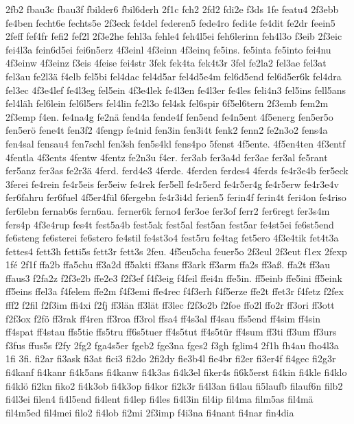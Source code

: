 {2fb2
fbau3c
fbau3f
fbilder6
fbil6derh
2f1c
fch2
2fd2
fdi2e
f3ds
1fe
featu4
2f3ebb
fe4ben
fecht6e
fechts5e
2f3eck
fe4del
federen5
fede4ro
fedi4e
fe4dit
fe2dr
feein5
2feff
fef4fr
fefi2
fef2l
2f3e2he
fehl3a
fehle4
feh4l5ei
feh6lerinn
feh4l3o
f3eib
2f3eic
fei4l3a
fein6d5ei
fei6n5erz
4f3einl
4f3einn
4f3einq
fe5ins.
fe5inta
fe5into
fei4nu
4f3einw
4f3einz
f3eis
4feise
fei4str
3fek
fek4ta
fek4t3r
3fel
fe2la2
fel3ae
fel3at
fel3au
fe2l3ä
f4elb
fel5bi
fel4dac
fel4d5ar
fel4d5e4m
fel6d5end
fel6d5er6k
fel4dra
fel3ec
4f3e4lef
fe4l3eg
fel5ein
4f3e4lek
fe4l3en
fe4l3er
fe4les
feli4n3
fel5ins
fell5ans
fel4läh
fel6lein
fel6l5ers
fel4lin
fe2l3o
fel4sk
fel6spir
6f5el6tern
2f3emb
fem2m
2f3emp
f4en.
fe4na4g
fe2nä
fend4a
fende4f
fen5end
fe4n5ent
4f5energ
fen5er5o
fen5erö
fene4t
fen3f2
4fengp
fe4nid
fen3in
fen3i4t
fenk2
fenn2
fe2n3o2
fens4a
fen4sal
fensau4
fen7schl
fen3sh
fen5s4kl
fens4po
5fenst
4f5ente.
4f5en4ten
4f3entf
4fentla
4f3ents
4fentw
4fentz
fe2n3u
f4er.
fer3ab
fer3a4d
fer3ae
fer3al
fe5rant
fer5anz
fer3as
fe2r3ä
4ferd.
ferd4e3
4ferde.
4ferden
ferdes4
4ferds
fe4r3e4b
fer5eck
3ferei
fe4rein
fe4r5eis
fer5eiw
fe4rek
fer5ell
fe4r5erd
fe4r5er4g
fe4r5erw
fe4r3e4v
fer6fahru
fer6fuel
4f5er4fül
6fergebn
fe4r3i4d
ferien5
ferin4f
ferin4t
feri4on
fe4riso
fer6lebn
fernab6s
fern6au.
ferner6k
ferno4
fer3oe
fer3of
ferr2
fer6regt
fer3s4m
fers4p
4f3e4rup
fes4t
fest5a4b
fest5ak
fest5al
fest5an
fest5ar
fe4st5ei
fe6st5end
fe6steng
fe6sterei
fe6stero
fe4stil
fe4st3o4
fest5ru
fe4tag
fet5ero
4f3e4tik
fet4t3a
fettes4
fett3h
fetti5s
fett3r
fett3s
2feu.
4f5eu5cha
feuer5o
2f3eul
2f3eut
f1ex
2fexp
1fé
2f1f
ffa2b
ffa5chu
ff3a2d
ff5akti
ff3ans
ff3ark
ff3arm
ffa2s
ff3aß.
ffa2t
ff3au
ffaus3
f2fa2z
f2f3e2b
ffe2e3
f2f3ef
f4f3eig
f4feil
ffei4n
ffe5in.
ff5einb
ffe5ini
ff5eink
ff5eins
ffel3a
f4felem
ffe2m
f4f3emi
ffe4rec
f4f3erh
f4f5erze
ffe2t
ffet3r
f4fetz
f2fex
fff2
f2fil
f2f3im
ffi4xi
f2fj
ff3län
ff3lät
ff3lec
f2f3o2b
f2foe
ffo2l
ffo2r
ff3ori
ff3ott
f2f3ox
f2fö
ff3rak
ff4ren
ff3roa
ff3rol
ffsa4
ff4s3al
ff4sau
ffs5end
ff4sim
ff4sin
ff4spat
ff4stau
ffs5tie
ffs5tru
ff6s5tuer
ff4s5tut
ff4s5tür
ff4sum
ff3ti
ff3um
ff3urs
f3fus
ffus5s
f2fy
2fg2
fga4s5er
fgeb2
fge3na
fges2
f3gh
fglim4
2f1h
fh4au
fho4l3a
1fi
3fi.
fi2ar
fi3ask
fi3at
fici3
fi2do
2fi2dy
fie3b4l
fie4br
fi2er
fi3er4f
fi4gec
fi2g3r
fi4kanf
fi4kanr
fi4k5ans
fi4kanw
fi4k3as
fi4k3el
fiker4s
fi6k5erst
fi4kin
fi4kle
fi4klo
fi4klö
fi2kn
fiko2
fi4k3ob
fi4k3op
fi4kor
fi2k3r
fi4l3an
fi4lau
fi5laufb
filauf6n
filb2
fi4l3ei
filen4
fi4l5end
fi4lent
fi4lep
fi4les
fi4l3in
fil4ip
fil4ma
film5as
fil4mä
fil4m5ed
fil4mei
filo2
fi4lob
fi2mi
2f3imp
f4i3na
fi4nant
fi4nar
fin4dia
}

